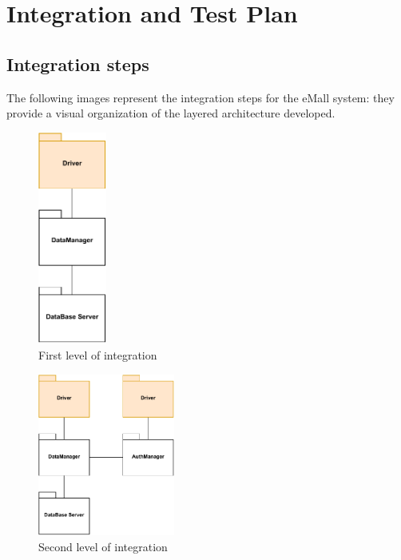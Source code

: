 \section{Integration and Test Plan}
\subsection{Integration steps}
The following images represent the integration steps for the eMall system: they provide a visual organization of the layered architecture developed.
\begin{figure}[H]
    \centering
    \includegraphics[width=0.2\textwidth]{images/1.pdf}
    \caption{First level of integration}
    \label{fig:1}
\end{figure}
\begin{figure}[H]
    \centering
    \includegraphics[width=0.4\textwidth]{images/2.pdf}
    \caption{Second level of integration}
    \label{fig:1}
\end{figure}

